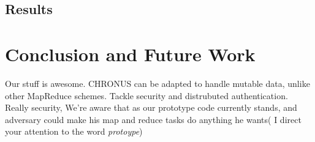 \documentclass[conference, compsocconf, letterpaper]{IEEEtran}
\begin{document}
 
\subsection{Results}

\section{Conclusion and Future Work}
Our stuff \cite{code} is awesome.
CHRONUS can be adapted to handle mutable data, unlike other MapReduce schemes.
Tackle security and distrubuted authentication.
Really security,  We're aware that as our prototype code currently stands, and adversary could make his map and reduce tasks do anything he wants(   I direct your attention to the word \emph{protoype})



\end{document}
